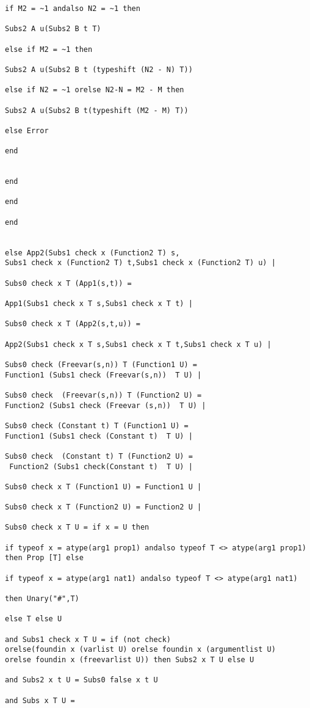 \documentclass{article}
\begin{document}
{{\begin{verbatim}
if M2 = ~1 andalso N2 = ~1 then

Subs2 A u(Subs2 B t T)

else if M2 = ~1 then

Subs2 A u(Subs2 B t (typeshift (N2 - N) T))

else if N2 = ~1 orelse N2-N = M2 - M then

Subs2 A u(Subs2 B t(typeshift (M2 - M) T))

else Error

end


end

end

end


else App2(Subs1 check x (Function2 T) s,
Subs1 check x (Function2 T) t,Subs1 check x (Function2 T) u) |

Subs0 check x T (App1(s,t)) =

App1(Subs1 check x T s,Subs1 check x T t) |

Subs0 check x T (App2(s,t,u)) =

App2(Subs1 check x T s,Subs1 check x T t,Subs1 check x T u) |

Subs0 check (Freevar(s,n)) T (Function1 U) = 
Function1 (Subs1 check (Freevar(s,n))  T U) |

Subs0 check  (Freevar(s,n)) T (Function2 U) = 
Function2 (Subs1 check (Freevar (s,n))  T U) |

Subs0 check (Constant t) T (Function1 U) = 
Function1 (Subs1 check (Constant t)  T U) |

Subs0 check  (Constant t) T (Function2 U) =
 Function2 (Subs1 check(Constant t)  T U) |

Subs0 check x T (Function1 U) = Function1 U |

Subs0 check x T (Function2 U) = Function2 U |

Subs0 check x T U = if x = U then 

if typeof x = atype(arg1 prop1) andalso typeof T <> atype(arg1 prop1)
then Prop [T] else

if typeof x = atype(arg1 nat1) andalso typeof T <> atype(arg1 nat1) 

then Unary("#",T)

else T else U

and Subs1 check x T U = if (not check) 
orelse(foundin x (varlist U) orelse foundin x (argumentlist U) 
orelse foundin x (freevarlist U)) then Subs2 x T U else U 

and Subs2 x t U = Subs0 false x t U

and Subs x T U = 


\end{verbatim}}}
\end{document}
